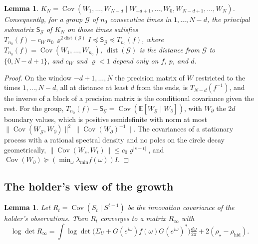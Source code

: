 \documentclass[11pt,onecolumn]{IEEEtran}
\newtheorem{lemma}[theorem]{Lemma}
\newcommand{\E}{\mathbb{E}}
\newcommand{\Cov}{\operatorname{Cov}}
\newcommand{\dw}{\tfrac{d\omega}{2\pi}}
\newcommand{\rhid}{\rho_{\mathrm{hid}}}
\begin{document}
\begin{lemma}\label{lem:stationary}
$K_N=\Cov(W_1,\dots,W_{N-d}\mid W_{-d+1},\dots,W_0,W_{N-d+1},\dots,W_N)$.
Consequently, for a group $\mathcal G$ of $n_0$ consecutive times in
$1,\dots,N-d$, the principal submatrix $\mathsf S_{\mathcal G}$ of $K_N$
on those times satisfies
$T_{n_0}(f)-c_W\,n_0\,\varrho^{2\operatorname{dist}(\mathcal G)}I\preceq\mathsf S_{\mathcal G}\preceq T_{n_0}(f)$,
where $T_{n_0}(f)=\Cov(W_1,\dots,W_{n_0})$, $\operatorname{dist}(\mathcal G)$
is the distance from $\mathcal G$ to $\{0,N-d+1\}$, and $c_W$ and
$\varrho<1$ depend only on $f$, $p$, and $d$.
\end{lemma}

\begin{proof}
On the window $-d+1,\dots,N$ the precision matrix of $W$ restricted to
the times $1,\dots,N-d$, all at distance at least $d$ from the ends, is
$T_{N-d}(f^{-1})$, and the inverse of a block of a precision matrix is
the conditional covariance given the rest. For the group,
$T_{n_0}(f)-\mathsf S_{\mathcal G}=\Cov(\E[W_{\mathcal G}\mid W_\partial])$,
with $W_\partial$ the $2d$ boundary values, which is positive
semidefinite with norm at most
$\|\Cov(W_{\mathcal G},W_\partial)\|^2\,\|\Cov(W_\partial)^{-1}\|$. The
covariances of a stationary process with a rational spectral density
and no poles on the circle decay geometrically,
$\|\Cov(W_s,W_t)\|\le c_0\varrho^{|s-t|}$, and
$\Cov(W_\partial)\succeq(\min_\omega\lambda_{\min}f(\omega))I$.
\end{proof}

\subsection{The holder's view of the growth}

\begin{lemma}\label{lem:innovations}
Let $R_t=\Cov(S_t\mid S^{t-1})$ be the innovation covariance of the
holder's observations. Then $R_t$ converges to a matrix $R_\infty$ with
\[
\log\det R_\infty=\int\log\det\bigl(\Sigma_U+G(e^{i\omega})f(\omega)G(e^{i\omega})^*\bigr)\dw+2(\rho_\star-\rhid).
\]
\end{lemma}
\end{document}
